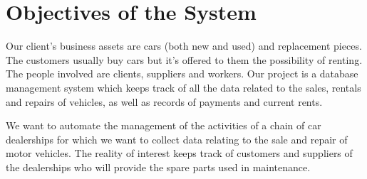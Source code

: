 \section{Objectives of the System}

Our client's business assets are cars (both new and used) and replacement pieces.
The customers usually buy cars but it's offered to them the possibility of renting.
The people involved are clients, suppliers and workers.
Our project is a database management system which keeps track of all the data related
to the sales, rentals and repairs of vehicles, as well as records of payments and current rents.

\medskip

\noindent We want to automate the management of the activities of a chain of car dealerships
for which we want to collect data relating to the sale and repair of motor vehicles.
The reality of interest keeps track of customers and suppliers of the dealerships
who will provide the spare parts used in maintenance.
